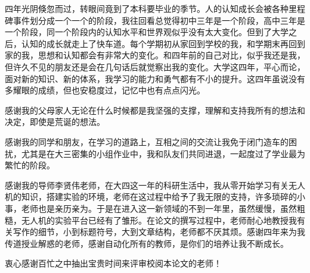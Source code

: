 
\begin{acknowledgements}
四年光阴倏忽而过，转眼间竟到了本科要毕业的季节。人的认知成长会被各种里程碑事件划分成一个一个的阶段，我往回看总觉得初中三年是一个阶段，高中三年是一个阶段，同一个阶段内的认知水平和世界观似乎没有太大变化。但到了大学之后，认知的成长就走上了快车道。每个学期初从家回到学校的我，和学期末再回到家的我，思想和认知都会有非常大的变化。和四年前的自己对比，似乎我还是我，但许久不见的朋友还是会在几句话后就觉察出我的变化。大学这四年，平心而论，面对新的知识、新的体系，我学习的能力和勇气都有不小的提升。这四年虽说没有多耀眼的成绩，但也安稳度过，记忆中也有点点闪光。

感谢我的父母家人无论在什么时候都是我坚强的支撑，理解和支持我所有的想法和决定，即使是荒诞的想法。

感谢我的同学和朋友，在学习的道路上，互相之间的交流让我免于闭门造车的困扰，尤其是在大三密集的小组作业中，我和队友们共同进退，一起度过了学业最为繁忙的阶段。

感谢我的导师李贤伟老师，在大四这一年的科研生活中，我从零开始学习有关无人机的知识，搭建实验的环境，老师在这过程中给予了我无限的支持，许多琐碎的小事，老师也是亲历亲为。于是在进入这一新领域的不到一年里，虽然缓慢，虽然粗糙，无人机的实验平台已经有了雏形。在论文的撰写过程中，老师耐心地教授我有关写作的细节，小到标题符号，大到文章结构，老师都不厌其烦。感谢四年来为我传道授业解惑的老师，感谢自动化所有的教师，是你们的培养让我不断成长。

衷心感谢百忙之中抽出宝贵时间来评审校阅本论文的老师！
\end{acknowledgements}
